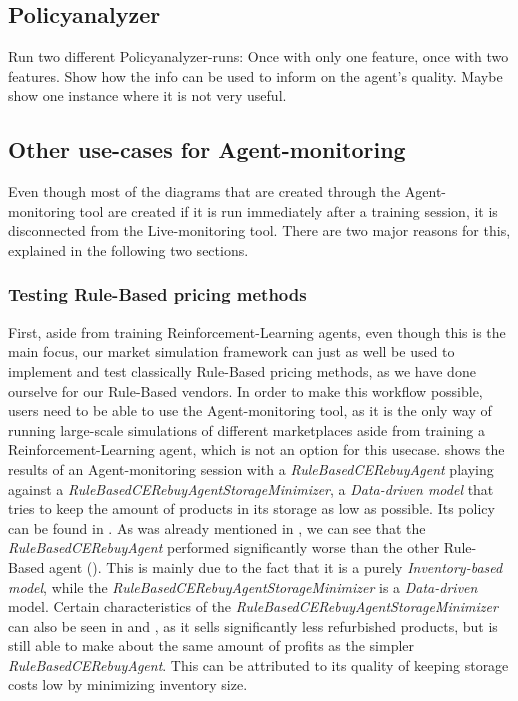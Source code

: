 \subsection*{Policyanalyzer}

Run two different Policyanalyzer-runs: Once with only one feature, once with two features. Show how the info can be used to inform on the agent's quality. Maybe show one instance where it is not very useful.

\subsection*{Other use-cases for Agent-monitoring}

Even though most of the diagrams that are created through the Agent-monitoring tool are created if it is run immediately after a training session, it is disconnected from the Live-monitoring tool. There are two major reasons for this, explained in the following two sections.

\subsubsection*{Testing Rule-Based pricing methods}

First, aside from training Reinforcement-Learning agents, even though this is the main focus, our market simulation framework can just as well be used to implement and test classically Rule-Based pricing methods, as we have done ourselve for our Rule-Based vendors. In order to make this workflow possible, users need to be able to use the Agent-monitoring tool, as it is the only way of running large-scale simulations of different marketplaces aside from training a Reinforcement-Learning agent, which is not an option for this usecase.  shows the results of an Agent-monitoring session with a \emph{RuleBasedCERebuyAgent} playing against a \emph{RuleBasedCERebuyAgentStorageMinimizer}, a \emph{Data-driven model} that tries to keep the amount of products in its storage as low as possible. Its policy can be found in . As was already mentioned in , we can see that the \emph{RuleBasedCERebuyAgent} performed significantly worse than the other Rule-Based agent (). This is mainly due to the fact that it is a purely \emph{Inventory-based model}, while the \emph{RuleBasedCERebuyAgentStorageMinimizer} is a \emph{Data-driven} model. Certain characteristics of the \emph{RuleBasedCERebuyAgentStorageMinimizer} can also be seen in  and , as it sells significantly less refurbished products, but is still able to make about the same amount of profits as the simpler \emph{RuleBasedCERebuyAgent}. This can be attributed to its quality of keeping storage costs low by minimizing inventory size.

